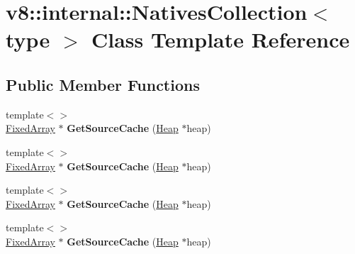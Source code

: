 \hypertarget{classv8_1_1internal_1_1_natives_collection}{}\section{v8\+:\+:internal\+:\+:Natives\+Collection$<$ type $>$ Class Template Reference}
\label{classv8_1_1internal_1_1_natives_collection}
\subsection*{Public Member Functions}
\begin{DoxyCompactItemize}
\item 
{\footnotesize template$<$$>$ }\\\hyperlink{classv8_1_1internal_1_1_fixed_array}{Fixed\+Array} $\ast$ {\bfseries Get\+Source\+Cache} (\hyperlink{classv8_1_1internal_1_1_heap}{Heap} $\ast$heap)\hypertarget{classv8_1_1internal_1_1_natives_collection_adc7e5b2a0922b9e1e67d68b0f8ea83bd}{}\label{classv8_1_1internal_1_1_natives_collection_adc7e5b2a0922b9e1e67d68b0f8ea83bd}

\item 
{\footnotesize template$<$$>$ }\\\hyperlink{classv8_1_1internal_1_1_fixed_array}{Fixed\+Array} $\ast$ {\bfseries Get\+Source\+Cache} (\hyperlink{classv8_1_1internal_1_1_heap}{Heap} $\ast$heap)\hypertarget{classv8_1_1internal_1_1_natives_collection_a0c9580cb9af40acece29febd6c1757fb}{}\label{classv8_1_1internal_1_1_natives_collection_a0c9580cb9af40acece29febd6c1757fb}

\item 
{\footnotesize template$<$$>$ }\\\hyperlink{classv8_1_1internal_1_1_fixed_array}{Fixed\+Array} $\ast$ {\bfseries Get\+Source\+Cache} (\hyperlink{classv8_1_1internal_1_1_heap}{Heap} $\ast$heap)\hypertarget{classv8_1_1internal_1_1_natives_collection_a29c210380a5776aa4dd03bcae4a55c1c}{}\label{classv8_1_1internal_1_1_natives_collection_a29c210380a5776aa4dd03bcae4a55c1c}

\item 
{\footnotesize template$<$$>$ }\\\hyperlink{classv8_1_1internal_1_1_fixed_array}{Fixed\+Array} $\ast$ {\bfseries Get\+Source\+Cache} (\hyperlink{classv8_1_1internal_1_1_heap}{Heap} $\ast$heap)\hypertarget{classv8_1_1internal_1_1_natives_collection_a4dc542d01fb5a0ff64769a51c59c9c34}{}\label{classv8_1_1internal_1_1_natives_collection_a4dc542d01fb5a0ff64769a51c59c9c34}

\end{DoxyCompactItemize}
